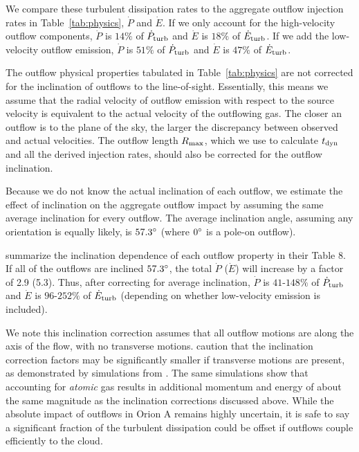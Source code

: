 \documentclass[twocolumn]{aastex63}
\begin{document}
We compare these turbulent dissipation rates to the aggregate outflow injection rates in Table~\ref{tab:physics}, $\dot P$ and $\dot E$. If we only account for the high-velocity outflow components, $\dot P$ is $14\%$ of $\dot P_{\rm turb}$ and $\dot E$ is $18\%$ of $\dot E_{\rm turb}$. If we add the low-velocity outflow emission, $\dot P$ is $51\%$ of $\dot P_{\rm turb}$ and $\dot E$ is $47\%$ of $\dot E_{\rm turb}$.

The outflow physical properties tabulated in Table~\ref{tab:physics} are not corrected for the inclination of outflows to the line-of-sight. Essentially, this means we assume that the radial velocity of outflow emission with respect to the source velocity is equivalent to the actual velocity of the outflowing gas. The closer an outflow is to the plane of the sky, the larger the discrepancy between observed and actual velocities. The outflow length $R_{\rm max}$, which we use to calculate $t_{\rm dyn}$ and all the derived injection rates, should also be corrected for the outflow inclination.

Because we do not know the actual inclination of each outflow, we estimate the effect of inclination on the aggregate outflow impact by assuming the same average inclination for every outflow. The average inclination angle, assuming any orientation is equally likely, is $57.3\mbox{$^\circ$}$ (where $0\mbox{$^\circ$}$ is a pole-on outflow).


\citet{Dunham14} summarize the inclination dependence of each outflow property in their Table 8. If all of the outflows are inclined $57.3\mbox{$^\circ$}$, the total $\dot P$ ($\dot E$) will increase by a factor of 2.9 (5.3). Thus, after correcting for average inclination, $\dot P$ is  $41$-$148\%$ of $\dot P_{\rm turb}$ and $\dot E$ is $96$-$252\%$ of $\dot E_{\rm turb}$ (depending on whether low-velocity emission is included).

We note this inclination correction assumes that all outflow motions are along the axis of the flow, with no transverse motions. \citet{Dunham14} caution that the inclination correction factors may be significantly smaller if transverse motions are present, as demonstrated by simulations from \citet{Downes07}. The same simulations show that accounting for \emph{atomic} gas results in additional momentum and energy of about the same magnitude as the inclination corrections discussed above. While the absolute impact of outflows in Orion A remains highly uncertain, it is safe to say a significant fraction of the turbulent dissipation could be offset if outflows couple efficiently to the cloud. %
\end{document}
